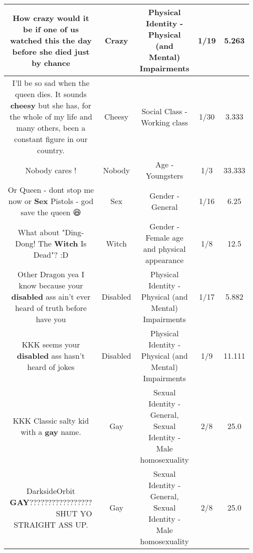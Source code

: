 \documentclass[11pt]{article}
\newlength\mylength
\begin{document}
\begin{center}
\begin{longtable}{|C{.65\mylength}|C{.30\mylength}|C{.12\mylength}|C{.12\mylength}|C{.12\mylength}|}
  \small How \textbf{crazy} would it be if one of us watched this the day before she died just by chance\normalsize   & Crazy & Physical Identity - Physical (and Mental) Impairments & 1/19 & 5.263 \\  \hline
  \small I'll be so sad when the queen dies. It sounds \textbf{cheesy} but she has, for the whole of my life and many others, been a constant figure in our country.\normalsize   & Cheesy & Social Class - Working class & 1/30 & 3.333 \\  \hline
  \small Nobody cares !\normalsize   & Nobody & Age - Youngsters & 1/3 & 33.333 \\  \hline
  \small Or Queen - dont stop me now or \textbf{Sex} Pistols - god save the queen 😆\normalsize   & Sex & Gender - General & 1/16 & 6.25 \\  \hline
  \small What about "Ding-Dong! The \textbf{Witch} Is Dead"? :D\normalsize   & Witch & Gender - Female age and physical appearance & 1/8 & 12.5 \\  \hline
  \small Other Dragon yea I know because your \textbf{disabled} ass ain't ever heard of truth before have you\normalsize   & Disabled & Physical Identity - Physical (and Mental) Impairments & 1/17 & 5.882 \\  \hline
  \small KKK seems your \textbf{disabled} ass hasn't heard of jokes\normalsize   & Disabled & Physical Identity - Physical (and Mental) Impairments & 1/9 & 11.111 \\  \hline
  \small KKK Classic salty kid with a \textbf{g\textbf{ay}} name.\normalsize   & Gay & Sexual Identity - General, Sexual Identity - Male homosexuality & 2/8 & 25.0 \\  \hline
  \small DarksideOrbit \textbf{G\textbf{AY}}????????????????? 🏳️‍🌈🏳️‍🌈🏳️‍🌈🏳️‍🌈🏳️‍🌈🏳️‍🌈🏳️‍🌈🏳️‍🌈🏳️‍🌈🏳️‍🌈 SHUT YO STRAIGHT ASS UP.\normalsize   & Gay & Sexual Identity - General, Sexual Identity - Male homosexuality & 2/8 & 25.0 \\  \hline

\end{longtable}
\end{center}
\end{document}
